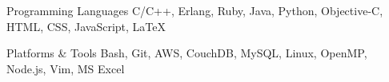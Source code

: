 

\begin{cvskills}

  \cvskill
    {Programming Languages} %
    {C/C++, Erlang, Ruby, Java, Python, Objective-C, HTML, CSS, JavaScript, LaTeX} %

  \cvskill
  {Platforms \& Tools} %
    {Bash, Git, AWS, CouchDB, MySQL, Linux, OpenMP, Node.js, Vim, MS Excel} %

\end{cvskills}

